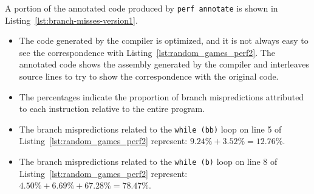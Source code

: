 \documentclass[12pt,a4paper,twoside,openright]{book}
\begin{document}
A portion of the annotated code produced by \texttt{perf annotate} is shown in Listing~\ref{lst:branch-misses-version1}.
\begin{itemize}
\item The code generated by the compiler is optimized, and it is not always easy to see the correspondence with Listing~\ref{lst:random_games_perf2}. The annotated code shows the assembly generated by the compiler and interleaves source lines to try to show the correspondence with the original code.
\item The percentages indicate the proportion of branch mispredictions attributed to each instruction relative to the entire program.
\item The branch mispredictions related to the \texttt{while (bb)} loop on line 5 of Listing~\ref{lst:random_games_perf2} represent: $9.24\% + 3.52\% = 12.76\%$.
\item The branch mispredictions related to the \texttt{while (b)} loop on line 8 of Listing~\ref{lst:random_games_perf2} represent: $4.50\% + 6.69\% + 67.28\% = 78.47\%$.

\end{itemize}
\end{document}
